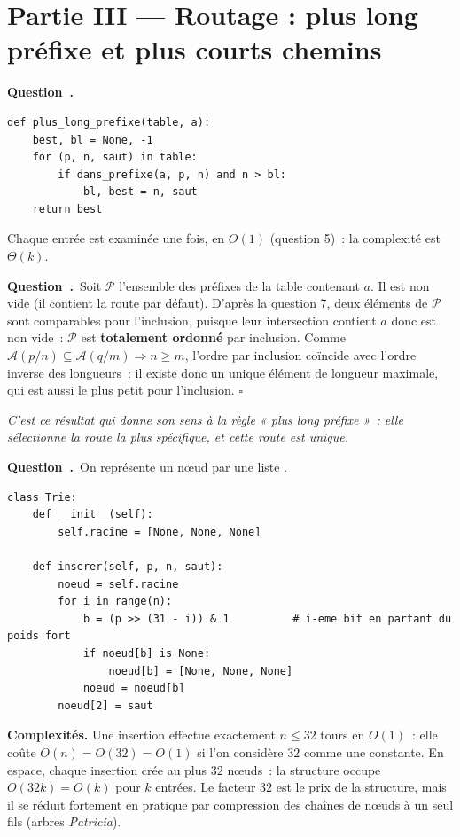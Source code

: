 \documentclass[11pt,a4paper]{article}
\renewcommand{\Q}{\medskip\par\stepcounter{qcnt}\noindent\textbf{\color{cnc}Question~\theqcnt.}~}
\begin{document}
\section*{Partie III --- Routage : plus long préfixe et plus courts chemins}

\Q
\begin{lstlisting}
def plus_long_prefixe(table, a):
    best, bl = None, -1
    for (p, n, saut) in table:
        if dans_prefixe(a, p, n) and n > bl:
            bl, best = n, saut
    return best
\end{lstlisting}
Chaque entrée est examinée une fois, en $O(1)$ (question 5)~: la complexité est
$\Theta(k)$.

\Q Soit $\mathcal{P}$ l'ensemble des préfixes de la table contenant $a$. Il est non vide (il
contient la route par défaut). D'après la question 7, deux éléments de $\mathcal{P}$ sont
comparables pour l'inclusion, puisque leur intersection contient $a$ donc est non vide~:
$\mathcal{P}$ est \textbf{totalement ordonné} par inclusion. Comme
$\mathcal{A}(p/n)\subseteq\mathcal{A}(q/m)\Rightarrow n\ge m$, l'ordre par inclusion coïncide
avec l'ordre inverse des longueurs~: il existe donc un unique élément de longueur maximale,
qui est aussi le plus petit pour l'inclusion. \hfill$\square$

\emph{C'est ce résultat qui donne son sens à la règle « plus long préfixe »~: elle sélectionne
la route la plus spécifique, et cette route est unique.}

\Q On représente un n\oe ud par une liste .
\begin{lstlisting}
class Trie:
    def __init__(self):
        self.racine = [None, None, None]

    def inserer(self, p, n, saut):
        noeud = self.racine
        for i in range(n):
            b = (p >> (31 - i)) & 1          # i-eme bit en partant du poids fort
            if noeud[b] is None:
                noeud[b] = [None, None, None]
            noeud = noeud[b]
        noeud[2] = saut
\end{lstlisting}
\textbf{Complexités.} Une insertion effectue exactement $n\le 32$ tours en $O(1)$~: elle
coûte $O(n)=O(32)=O(1)$ si l'on considère $32$ comme une constante. En espace, chaque
insertion crée au plus $32$ n\oe uds~: la structure occupe $O(32k)=O(k)$ pour $k$ entrées.
Le facteur $32$ est le prix de la structure, mais il se réduit fortement en pratique par
compression des chaînes de n\oe uds à un seul fils (arbres \emph{Patricia}).
\end{document}
